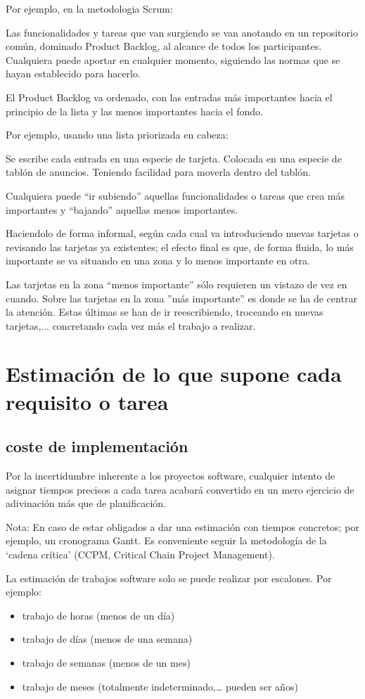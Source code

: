 \documentclass[spanish,12pt,a4paper,final,oneside]{book}
\begin{document}
Por ejemplo, en la metodologia Scrum:

Las funcionalidades y tareas que van surgiendo se van anotando en un repositorio común, dominado Product Backlog, al alcance de todos los participantes. Cualquiera puede aportar en cualquier momento, siguiendo las normas que se hayan establecido para hacerlo.

El Product Backlog va ordenado, con las entradas más importantes hacia el principio de la lista y las menos importantes hacia el fondo.  

Por ejemplo, usando una lista priorizada en cabeza:

Se escribe cada entrada en una especie de tarjeta. Colocada en una especie de tablón de anuncios. Teniendo facilidad para moverla dentro del tablón. 

Cualquiera puede  ``ir subiendo'' aquellas funcionalidades o tareas que crea más importantes y ``bajando'' aquellas menos importantes. 

Haciendolo de forma informal, según cada cual va introduciendo nuevas tarjetas o revisando las tarjetas ya existentes; el efecto final es que, de forma fluida, lo más importante se va situando en una zona y lo menos importante en otra.

Las tarjetas en la zona ``menos importante'' sólo requieren un vistazo de vez en cuando. Sobre las tarjetas en la zona ''más importante'' es donde se ha de centrar la atención. Estas últimas se han de ir reescribiendo, troceando en nuevas tarjetas,... concretando cada vez más el trabajo a realizar.

\section{Estimación de lo que supone cada requisito o tarea}
\subsection{coste de implementación}
Por la incertidumbre inherente a los proyectos software, cualquier intento de asignar tiempos precisos a cada tarea acabará convertido en un mero ejercicio de adivinación más que de planificación.

Nota: En caso de estar obligados a dar una estimación con tiempos concretos; por ejemplo, un cronograma Gantt. Es conveniente seguir la metodología de la ‘cadena crítica’ (CCPM, Critical Chain Project Management).

La estimación de trabajos software solo se puede realizar por escalones. Por ejemplo:
\begin{itemize}
\item trabajo de horas (menos de un día)
\item trabajo de días (menos de una semana)
\item trabajo de semanas (menos de un mes)
\item trabajo de meses (totalmente indeterminado,… pueden ser años)
\end{itemize}
\end{document}
